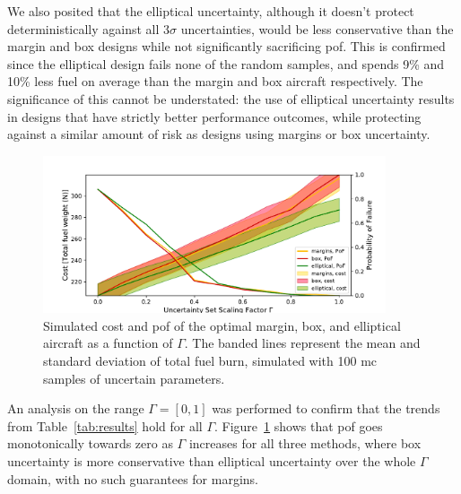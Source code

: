 We also posited that the elliptical uncertainty, although it doesn't
protect deterministically against all $3\sigma$ uncertainties, would be less conservative than the
margin and box designs while not significantly sacrificing \gls{pof}. This is
confirmed since the elliptical design fails none of the random samples,
and spends 9\% and 10\% less fuel on average
than the margin and box aircraft respectively.
The significance of this cannot be understated: the use of elliptical uncertainty
results in designs that have strictly better performance outcomes, while protecting
against a similar amount of risk as designs using margins or box uncertainty.

\begin{figure}[ht]
    \centering
    \captionsetup{justification=centering, font=small}
    \includegraphics[width=0.9\textwidth]{pof_and_cost.pdf}
    \caption{Simulated cost and \gls{pof} of the optimal margin, box, and elliptical aircraft
    as a function of $\Gamma$.
    The banded lines represent the mean and standard deviation of total fuel burn,
    simulated with 100 \gls{mc} samples of uncertain parameters.}
    \label{fig:probOfFailure}
\end{figure}

An analysis on the range $\Gamma=[0,1]$ was performed to confirm that the trends from
Table~\ref{tab:results} hold for all $\Gamma$. Figure~\ref{fig:probOfFailure}
shows that \gls{pof} goes monotonically
towards zero as $\Gamma$ increases for all three methods, where box uncertainty is
more conservative than elliptical uncertainty over the whole $\Gamma$ domain, with no
such guarantees for margins.

